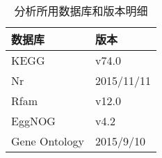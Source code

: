 \begin{table}[H]
        \begin{center}


        \caption{分析所用数据库和版本明细}
            \begin{threeparttable}
                \begin{tabularx}{\textwidth}{XX}

                    \toprule
                    \bfseries{数据库}&\bfseries{版本}\\
                    \midrule
                    		
                	
                    KEGG &v74.0\\
                    Nr	&2015/11/11\\
                    Rfam	&v12.0\\
                    EggNOG	&v4.2\\
                    Gene Ontology	&2015/9/10\\

                    \bottomrule

                \end{tabularx}

            \end{threeparttable}
        \end{center}
\end{table}



